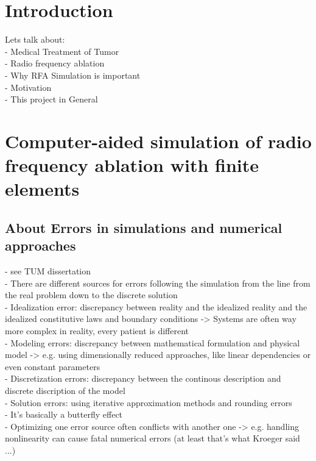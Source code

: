 \documentclass[parskip=half, titlepage=yes, 12pt, BCOR=12mm, DIV=calc]{scrartcl}
\begin{document}
\maketitle
\tableofcontents

\clearpage

\listoffigures
\listoftables
\lstlistoflistings
\clearpage



\section{Introduction}

Lets talk about:\\
- Medical Treatment of Tumor\\
- Radio frequency ablation\\
- Why RFA Simulation is important \\
- Motivation \\
- This project in General\\


\section{Computer-aided simulation of radio frequency ablation with finite elements}

\subsection{About Errors in simulations and numerical approaches}
- see TUM dissertation \\
- There are different sources for errors following the simulation from the line from the real problem down to the discrete solution \\
- Idealization error: discrepancy between reality and the idealized reality and the idealized constitutive laws and boundary conditions -> Systems are often way more complex in reality, every patient is different \\
- Modeling errors: discrepancy between mathematical formulation and physical model -> e.g. using dimensionally reduced approaches, like linear dependencies or even constant parameters  \\
-  Discretization errors: discrepancy between the continous description and discrete discription of the model \\
- Solution errors: using iterative approximation methods and rounding errors \\
- It's basically a butterfly effect \\
- Optimizing one error source often conflicts with another one -> e.g. handling nonlinearity can cause fatal numerical errors (at least that's what Kroeger said ...)
\end{document}
